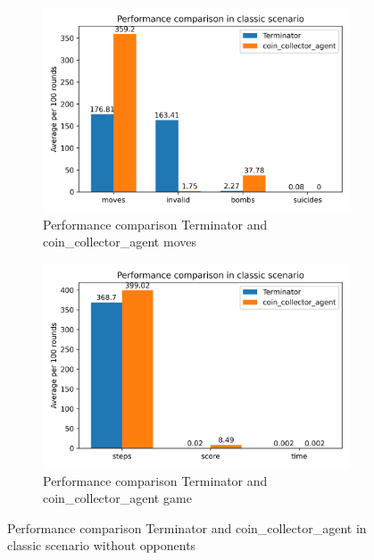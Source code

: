 \documentclass[
	letterpaper, %
	12pt, %
]{CSUniSchoolLabReport}
\begin{document}
\begin{figure}[H]

	\begin{subfigure}{\textwidth}
		\centering
		\includegraphics[scale=0.6]{Figures/Task2-1.png}
		\caption{Performance comparison Terminator and coin\_collector\_agent moves}
		\label{img:Task2-1}
	\end{subfigure}


	\begin{subfigure}{\textwidth}
		\centering
		\includegraphics[scale=0.6]{Figures/Task2-2.png}
		\caption{Performance comparison Terminator and coin\_collector\_agent game}
		\label{img:Task2-2}
	\end{subfigure}

	\caption{Performance comparison Terminator and coin\_collector\_agent in classic scenario without opponents}
	\label{img:Task2}
	
\end{figure}
\end{document}

